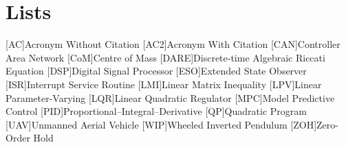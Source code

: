 \appendix
\renewcommand{\appendixtocname}{Appendix}
\renewcommand{\appendixpagename}{\appendixtocname}
\addappheadtotoc
{}
\appendixpage

\chapter{Lists}
\begin{acronym}[\hspace{3cm}]
  [AC]{Acronym Without Citation}
  [AC2]{Acronym With Citation \cite{citeKey2}}
  [CAN]{Controller Area Network}
  [CoM]{Centre of Mass}
  [DARE]{Discrete-time Algebraic Riccati Equation}
  [DSP]{Digital Signal Processor}
  [ESO]{Extended State Observer}
  [ISR]{Interrupt Service Routine}
  [LMI]{Linear Matrix Inequality}
  [LPV]{Linear Parameter-Varying}
  [LQR]{Linear Quadratic Regulator}
  [MPC]{Model Predictive Control}
  [PID]{Proportional--Integral--Derivative}
  [QP]{Quadratic Program}
  [UAV]{Unmanned Aerial Vehicle}
  [WIP]{Wheeled Inverted Pendulum}
  [ZOH]{Zero-Order Hold}
\end{acronym}
\clearpage
\listoffigures
{}
